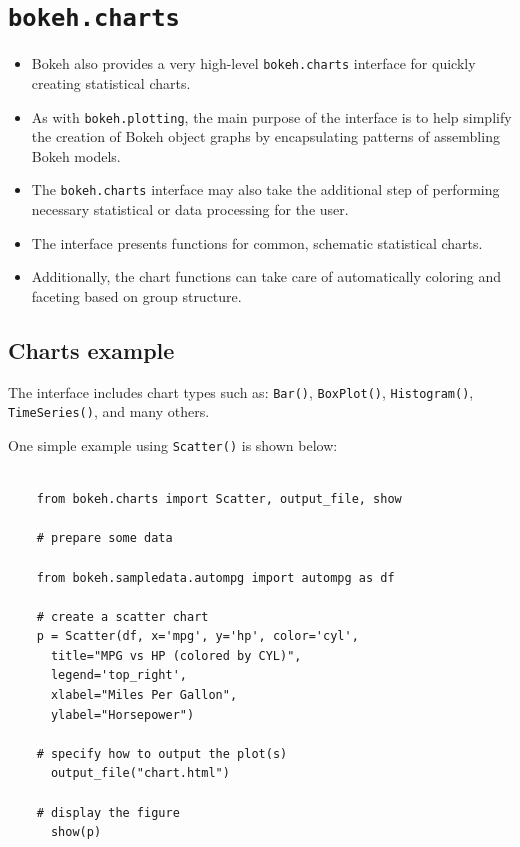 \documentclass[12pt, a4paper]{report}
\begin{document}
\section*{\texttt{bokeh.charts}}
\begin{itemize}
	\item Bokeh also provides a very high-level \texttt{bokeh.charts} interface for quickly creating statistical charts. 
	\item As with \texttt{bokeh.plotting}, the main purpose of the interface is to help simplify the creation of Bokeh object graphs by encapsulating patterns of assembling Bokeh models. 
	\item The \texttt{bokeh.charts} interface may also take the additional step of performing necessary statistical or data processing for the user. 
	
	\item The interface presents functions for common, schematic statistical charts. \item Additionally, the chart functions can take care of automatically coloring and faceting based on group structure.
\end{itemize}

\newpage

\subsection*{Charts example}
The interface includes chart types such as: \texttt{Bar()}, \texttt{BoxPlot()}, \texttt{Histogram()}, \texttt{TimeSeries()}, and many others. \\
\bigskip

\noindent One simple example using \texttt{Scatter()} is shown below:
{
	\begin{verbatim}
	
	from bokeh.charts import Scatter, output_file, show
	
	# prepare some data
	
	from bokeh.sampledata.autompg import autompg as df
	
	# create a scatter chart
	p = Scatter(df, x='mpg', y='hp', color='cyl',
	  title="MPG vs HP (colored by CYL)",
	  legend='top_right',
	  xlabel="Miles Per Gallon",
	  ylabel="Horsepower")
	
	# specify how to output the plot(s)
	  output_file("chart.html")
	
	# display the figure
	  show(p)
	\end{verbatim}
	
}
\end{document}
